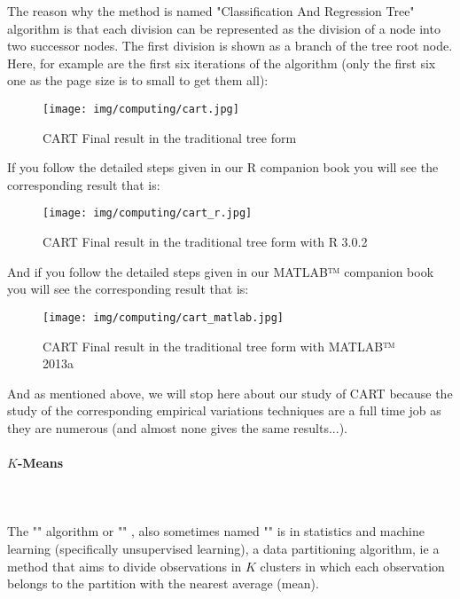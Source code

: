 	The reason why the method is named "Classification And Regression Tree" algorithm is that each division can be represented as the division of a node into two successor nodes. The first division is shown as a branch of the tree root node. Here, for example are the first six iterations of the algorithm (only the first six one as the page size is to small to get them all):
	\begin{figure}[H]
		\centering
		\texttt{[image: img/computing/cart.jpg]}
		\caption{CART Final result in the traditional tree form}
	\end{figure}
	If you follow the detailed steps given in our R companion book you will see the corresponding result that is:
	\begin{figure}[H]
		\centering
		\texttt{[image: img/computing/cart\_r.jpg]}
		\caption[]{CART Final result in the traditional tree form with R 3.0.2}
	\end{figure}
	And if you follow the detailed steps given in our MATLAB™ companion book you will see the corresponding result that is:
	\begin{figure}[H]
		\centering
		\texttt{[image: img/computing/cart\_matlab.jpg]}
		\caption[]{CART Final result in the traditional tree form with MATLAB™ 2013a}
	\end{figure}
	And as mentioned above, we will stop here about our study of CART because the study of the corresponding empirical variations techniques are a full time job as they are numerous (and almost none gives the same results...).
	
	\paragraph{$K$-Means}\mbox{}\\\\
	The "" algorithm or "" , also sometimes named "" is in statistics and machine learning (specifically unsupervised learning), a data partitioning algorithm, ie a method that aims to divide observations in $K$ clusters in which each observation belongs to the partition with the nearest average (mean).

